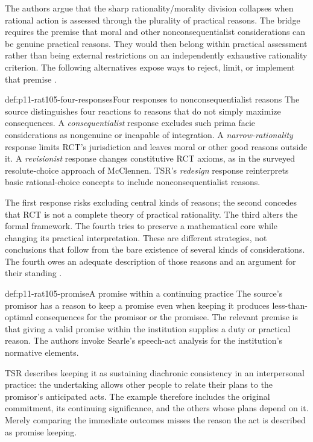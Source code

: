 The authors argue that the sharp rationality/morality division collapses
when rational action is assessed through the plurality of practical
reasons. The bridge requires the premise that moral and other
nonconsequentialist considerations can be genuine practical reasons.
They would then belong within practical assessment rather than being
external restrictions on an independently exhaustive rationality
criterion. The following alternatives expose ways to reject, limit,
or implement that premise
\parencite[p.~628]{NidaRumelinGutwaldZuber2021}.

\begin{hbdefinition}{def:p11-rat105-four-responses}{Four responses to nonconsequentialist reasons}
The source distinguishes four reactions to reasons that do not simply
maximize consequences. A \emph{consequentialist} response excludes such
prima facie considerations as nongenuine or incapable of integration.
A \emph{narrow-rationality} response limits RCT's jurisdiction and leaves
moral or other good reasons outside it. A \emph{revisionist} response
changes constitutive RCT axioms, as in the surveyed resolute-choice
approach of McClennen. TSR's \emph{redesign} response reinterprets basic
rational-choice concepts to include nonconsequentialist reasons.
\end{hbdefinition}

The first response risks excluding central kinds of reasons; the second
concedes that RCT is not a complete theory of practical rationality.
The third alters the formal framework. The fourth tries to preserve a
mathematical core while changing its practical interpretation. These
are different strategies, not conclusions that follow from the bare
existence of several kinds of considerations. The fourth owes an
adequate description of those reasons and an argument for their standing
\parencite[p.~628]{NidaRumelinGutwaldZuber2021}.

\begin{hbexample}{def:p11-rat105-promise}{A promise within a continuing practice}
The source's promisor has a reason to keep a promise even when keeping
it produces less-than-optimal consequences for the promisor or the
promisee. The relevant premise is that giving a valid promise within the
institution supplies a duty or practical reason. The authors invoke
Searle's speech-act analysis for the institution's normative elements.

TSR describes keeping it as sustaining diachronic consistency in an
interpersonal practice: the undertaking allows other people to relate
their plans to the promisor's anticipated acts. The example therefore
includes the original commitment, its continuing significance, and the
others whose plans depend on it. Merely comparing the immediate
outcomes misses the reason the act is described as promise keeping.
\end{hbexample}

